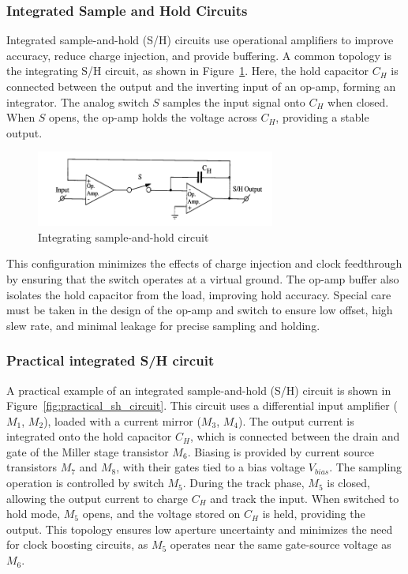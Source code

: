 \subsubsection{Integrated Sample and Hold Circuits}
Integrated sample-and-hold (S/H) circuits use operational amplifiers to improve accuracy, reduce charge injection, and provide buffering. A common topology is the integrating S/H circuit, as shown in Figure~\ref{fig:integrating_sh_circuit}. Here, the hold capacitor $C_H$ is connected between the output and the inverting input of an op-amp, forming an integrator. The analog switch $S$ samples the input signal onto $C_H$ when closed. When $S$ opens, the op-amp holds the voltage across $C_H$, providing a stable output.

\begin{figure}[h]
    \centering
    \includegraphics[width=0.7\textwidth]{figs/integrating_sh_config.png}
    \caption{Integrating sample-and-hold circuit}
    \label{fig:integrating_sh_circuit}
\end{figure}

This configuration minimizes the effects of charge injection and clock feedthrough by ensuring that the switch operates at a virtual ground. The op-amp buffer also isolates the hold capacitor from the load, improving hold accuracy. Special care must be taken in the design of the op-amp and switch to ensure low offset, high slew rate, and minimal leakage for precise sampling and holding.
\subsubsection{Practical integrated S/H circuit}
A practical example of an integrated sample-and-hold (S/H) circuit is shown in Figure~\ref{fig:practical_sh_circuit}. This circuit uses a differential input amplifier ($M_1$, $M_2$), loaded with a current mirror ($M_3$, $M_4$). The output current is integrated onto the hold capacitor $C_H$, which is connected between the drain and gate of the Miller stage transistor $M_6$. Biasing is provided by current source transistors $M_7$ and $M_8$, with their gates tied to a bias voltage $V_{bias}$. The sampling operation is controlled by switch $M_5$. During the track phase, $M_5$ is closed, allowing the output current to charge $C_H$ and track the input. When switched to hold mode, $M_5$ opens, and the voltage stored on $C_H$ is held, providing the output. This topology ensures low aperture uncertainty and minimizes the need for clock boosting circuits, as $M_5$ operates near the same gate-source voltage as $M_6$.

